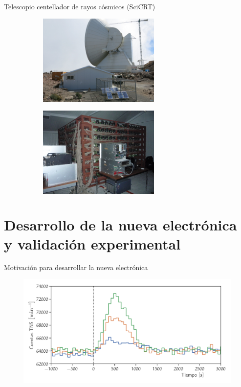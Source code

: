 \documentclass[spanish,aspectratio=169]{beamer}
\begin{document}
\begin{frame}{Telescopio centellador de rayos cósmicos (SciCRT)}

\begin{figure}
        \centering
        \begin{subfigure}[b]{0.45\textwidth}
                \includegraphics[width=6.0cm]{sn-scicrt.jpg}
        \end{subfigure}
        \begin{subfigure}[b]{0.45\textwidth}
                \includegraphics[width=6.0cm]{scicrt-full.jpg}
        \end{subfigure}
\end{figure}
\end{frame}


\section
[Desarrollo de la nueva electrónica y validación experimental]{Desarrollo de la nueva electrónica y validación experimental}
\frame{\sectionpage}


\begin{frame}{Motivación para desarrollar la nueva electrónica}

\begin{figure}
	\centering
	\includegraphics[width=\textwidth]{scicrt-sim.pdf}
\end{figure}

\end{frame}
\end{document}
